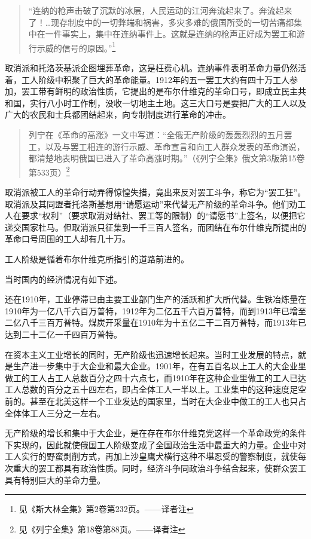 \begin{quotation}
“连纳的枪声击破了沉默的冰层，人民运动的江河奔流起来了。奔流起来了！…现存制度中的一切弊端和祸害，多灾多难的俄国所受的一切苦痛都集中在一件事实上，集中在连纳事件上。这就是连纳的枪声正好成为罢工和游行示威的信号的原因。”\footnote{见《斯大林全集》第2卷第232页。——译者注}
\end{quotation}

取消派和托洛茨基派企图埋葬革命，这是枉费心机。连纳事件表明革命力量仍然活着，工人阶级中积聚了巨大的革命能量。1912年的五一罢工大约有四十万工人参加，罢工带有鲜明的政治性质，它提出的是布尔什维克的革命口号，即成立民主共和国，实行八小时工作制，没收一切地主土地。这三大口号是要把广大的工人以及广大的农民和士兵都团结起来，向专制制度进行革命的冲击。

\begin{quotation}
列宁在《革命的高涨》一文中写道：“全俄无产阶级的轰轰烈烈的五月罢工，以及与罢工相连的游行示威、革命宣言和向工人群众发表的革命演说，都清楚地表明俄国已进入了革命高涨时期。”（《列宁全集》俄文第3版第15卷第533页）\footnote{见《列宁全集》第18卷第88页。——译者注}
\end{quotation}

取消派被工人的革命行动弄得惊惶失措，竟出来反对罢工斗争，称它为“罢工狂”。取消派及其同盟者托洛斯基想用“请愿运动”来代替无产阶级的革命斗争。他们劝工人在要求“权利”（要求取消对结社、罢工等的限制）的“请愿书”上签名，以便把它递交国家杜马。但取消派只征集到一千三百人签名，而团结在布尔什维克所提出的革命口号周围的工人却有几十万。

工人阶级是循着布尔什维克所指引的道路前进的。

当时国内的经济情况有如下述。

还在1910年，工业停滞已由主要工业部门生产的活跃和扩大所代替。生铁冶炼量在1910年为一亿八千六百万普特，1912年为二亿五千六百万普特，而到1913年已增至二亿八千三百万普特。煤炭开采量在1910年为十五亿二干二百万普特，而1913年已达到二十二亿一千四百万普特。

在资本主义工业增长的同时，无产阶级也迅速增长起来。当时工业发展的特点，就是生产进一步集中于大企业和最大企业。1901年，在有五百名以上工人的大企业里做工的工人占工人总数百分之四十六点七，而1910年在这种企业里做工的工人已达工人总数的百分之五十四左右，即占全体工人一半以上。工业集中的这种速度足空前的。甚至在北美这样一个工业发达的国家里，当时在大企业中做工的工人也只占全体体工人三分之一左右。

无产阶级的增长和集中于大企业，是在存在布尔什维克党这样一个革命政党的条件下实现的，因此就使俄国工人阶级变成了全国政治生活中最重大的力量。企业中对工人实行的野蛮剥削方式，再加上沙皇鹰犬横行这种不堪忍受的警察制度，就使每次重大的罢工都具有政治性质。同时，经济斗争同政治斗争结合起来，使群众罢工具有特别巨大的革命力量。

